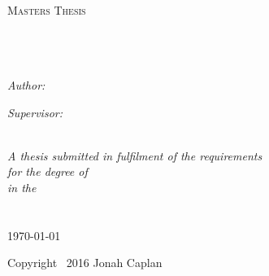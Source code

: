 \documentclass[
12pt, %
oneside, %
english, %
onehalfspacing, %
]{MastersDoctoralThesis} %
\author{Jonah \textsc{Caplan}} %
\begin{document}
\frontmatter %

\pagestyle{plain} %


\begin{titlepage}
\begin{center}

\textsc{\LARGE \univname}\\[1.5cm] %
\textsc{\Large Masters Thesis}\\[0.5cm] %

\HRule \\[0.4cm] %
{\huge \bfseries \ttitle}\\[0.4cm] %
\HRule \\[1.5cm] %
 
\begin{minipage}{0.4\textwidth}
\begin{flushleft} \large
\emph{Author:}\\
\authorname %
\end{flushleft}
\end{minipage}
\begin{minipage}{0.4\textwidth}
\begin{flushright} \large
\emph{Supervisor:} \\
\supname %
\end{flushright}
\end{minipage}\\[3cm]
 
\large \textit{A thesis submitted in fulfilment of the requirements\\ for the degree of \degreename}\\[0.3cm] %
\textit{in the}\\[0.4cm]
\groupname\\\deptname\\[2cm] %
 
{\large \today}\\[4cm] %
 
\vfill


Copyright \textsf{\textcopyright} \ 2016 Jonah Caplan

\end{center}

\end{titlepage}
\end{document}
